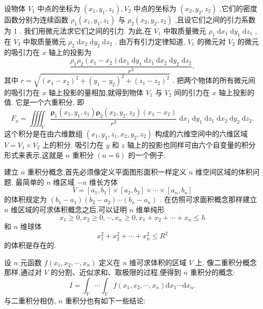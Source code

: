 设物体 \({V}_{1}\) 中点的坐标为 \(\left( {{x}_{1},{y}_{1},{z}_{1}}\right) ,{V}_{2}\) 中点的坐标为 \(\left( {{x}_{2},{y}_{2},{z}_{2}}\right)\) ,它们的密度函数分别为连续函数 \({\rho }_{1}\left( {{x}_{1},{y}_{1},{z}_{1}}\right)\) 与 \({\rho }_{2}\left( {{x}_{2},{y}_{2},{z}_{2}}\right)\) ,且设它们之间的引力系数为 1 . 我们用微元法求它们之间的引力. 为此,在 \({V}_{1}\) 中取质量微元 \({\rho }_{1}\mathrm{\;d}{x}_{1}\mathrm{\;d}{y}_{1}\mathrm{\;d}{z}_{1}\) ,在 \({V}_{2}\) 中取质量微元 \({\rho }_{2}\mathrm{\;d}{x}_{2}\mathrm{\;d}{y}_{2}\mathrm{\;d}{z}_{2}\) . 由万有引力定律知道, \({V}_{1}\) 的微元对 \({V}_{2}\) 的微元的吸引力在 \(x\) 轴上的投影为
\[
\frac{{\rho }_{1}{\rho }_{2}\left( {{x}_{1} - {x}_{2}}\right) \mathrm{d}{x}_{1}\mathrm{\;d}{y}_{1}\mathrm{\;d}{z}_{1}\mathrm{\;d}{x}_{2}\mathrm{\;d}{y}_{2}\mathrm{\;d}{z}_{2}}{{r}^{3}},
\]
其中 \(r = \sqrt{{\left( {x}_{1} - {x}_{2}\right) }^{2} + {\left( {y}_{1} - {y}_{2}\right) }^{2} + {\left( {z}_{1} - {z}_{2}\right) }^{2}}\) . 把两个物体的所有微元间的吸引力在 \(x\) 轴上投影的量相加,就得到物体 \({V}_{1}\) 与 \({V}_{2}\) 间的引力在 \(x\) 轴上投影的值. 它是一个六重积分, 即
\[
{F}_{x} = {\iiiint }_{V}\frac{{\mathbf{\rho }}_{1}\left( {{x}_{1},{y}_{1},{z}_{1}}\right) {\mathbf{\rho }}_{2}\left( {{x}_{2},{y}_{2},{z}_{2}}\right) \left( {{x}_{1} - {x}_{2}}\right) }{{r}^{3}}\mathrm{\;d}{x}_{1}\mathrm{\;d}{y}_{1}\mathrm{\;d}{z}_{1}\mathrm{\;d}{x}_{2}\mathrm{\;d}{y}_{2}\mathrm{\;d}{z}_{2}.
\]
这个积分是在由六维数组 \(\left( {{x}_{1},{y}_{1},{z}_{1},{x}_{2},{y}_{2},{z}_{2}}\right)\) 构成的六维空间中的六维区域 \(V = {V}_{1} \times  {V}_{2}\) 上的积分. 吸引力在 \(y\) 和 \(z\) 轴上的投影也同样可由六个自变量的积分形式来表示,这就是 \(n\) 重积分 \(\left( {n = 6}\right)\) 的一个例子.

建立 \(n\) 重积分概念,首先必须像定义平面图形面积一样定义 \(n\) 维空间区域的体积问题. 最简单的 \(n\) 维区域 \(- n\) 维长方体
\[
V = \left\lbrack  {{a}_{1},{b}_{1}}\right\rbrack   \times  \left\lbrack  {{a}_{2},{b}_{2}}\right\rbrack   \times  \cdots  \times  \left\lbrack  {{a}_{n},{b}_{n}}\right\rbrack
\]
的体积规定为 \(\left( {{b}_{1} - {a}_{1}}\right) \left( {{b}_{2} - {a}_{2}}\right) \cdots \left( {{b}_{n} - {a}_{n}}\right)\) . 在仿照可求面积概念那样建立 \(n\) 维区域的可求体积概念之后,可以证明 \(n\) 维单纯形
\[
{x}_{1} \geq  0,{x}_{2} \geq  0,\cdots ,{x}_{n} \geq  0,{x}_{1} + {x}_{2} + \cdots  + {x}_{n} \leq  h
\]
和 \(n\) 维球体
\[
{x}_{1}^{2} + {x}_{2}^{2} + \cdots  + {x}_{n}^{2} \leq  {R}^{2}
\]
的体积是存在的.

设 \(n\) 元函数 \(f\left( {{x}_{1},{x}_{2},\cdots ,{x}_{n}}\right)\) 定义在 \(n\) 维可求体积的区域 \(V\) 上. 像二重积分概念那样,通过对 \(V\) 的分割、近似求和、取极限的过程,便得到 \(n\) 重积分的概念:
\[
I = {\int }_{V}\cdots {\int }_{V}f\left( {{x}_{1},{x}_{2},\cdots ,{x}_{n}}\right) \mathrm{d}{x}_{1}\cdots \mathrm{d}{x}_{n}. \tag{1}
\]
与二重积分相仿, \(n\) 重积分也有如下一些结论:


